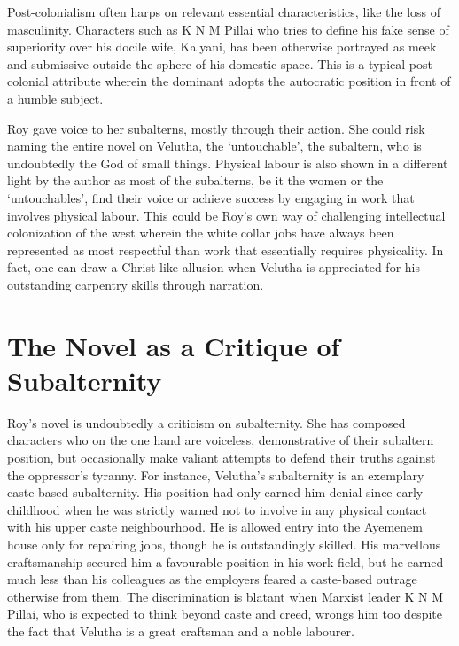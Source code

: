 Post-colonialism often harps on relevant essential characteristics, like the loss of masculinity. Characters such as K N M Pillai who tries to define his fake sense of superiority over his docile wife, Kalyani, has been otherwise portrayed as meek and submissive outside the sphere of his domestic space. This is a typical post-colonial attribute wherein the dominant adopts the autocratic position in front of a humble subject.  

Roy gave voice to her subalterns, mostly through their action. She could risk naming the entire novel on Velutha, the `untouchable', the subaltern, who is undoubtedly the God of small things. Physical labour is also shown in a different light by the author as most of the subalterns, be it the women or the `untouchables', find their voice or achieve success by engaging in work that involves physical labour. This could be Roy's own way of challenging intellectual colonization of the west wherein the white collar jobs have always been represented as most respectful than work that essentially requires physicality. In fact, one can draw a Christ-like allusion when Velutha is appreciated for his outstanding carpentry skills through narration.

\section{The Novel as a Critique of Subalternity}

Roy's novel is undoubtedly a criticism on subalternity. She has composed characters who on the one hand are voiceless, demonstrative of their subaltern position, but occasionally make valiant attempts to defend their truths against the oppressor's tyranny. For instance, Velutha's subalternity is an exemplary caste based subalternity. His position had only earned him denial since early childhood when he was strictly warned not to involve in any physical contact with his upper caste neighbourhood. He is allowed entry into the Ayemenem house only for repairing jobs, though he is outstandingly skilled. His marvellous craftsmanship secured him a favourable position in his work field, but he earned much less than his colleagues as the employers feared a caste-based outrage otherwise from them. The discrimination is blatant when Marxist leader K N M Pillai, who is expected to think beyond caste and creed, wrongs him too despite the fact that Velutha is a great craftsman and a noble labourer.

